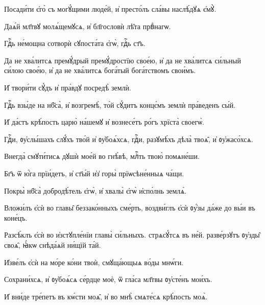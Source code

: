 \hKv Посади́ти є҆го̀ съ могꙋ́щими люде́й, и҆ престо́лъ сла́вы  наслѣ́дꙋѧ є҆мꙋ̀.  
%

\hKv Даѧ́й мл҃твꙋ молѧ́щемꙋсѧ, и҆ бл҃гословѝ лѣ̑та  првⷣнагѡ. 

\hKv Гдⷭ҇ь не́мощна сотворѝ сꙋпоста́та є҆гѡ̀, гдⷭ҇ь ст҃ъ. 
%

\hKv Да не хва́литсѧ премꙋ́дрый премꙋ́дростїю свое́ю, и҆  да не хва́литсѧ си́льный си́лою свое́ю, и҆ да не хва́литсѧ  бога́тый бога́тствомъ свои́мъ. 

\hKv И҆ твори́ти сꙋ́дъ и҆ пра́вдꙋ посредѣ̀ землѝ. 
%

\hKv Гдⷭ҇ь взы́де на нб҃са̀, и҆ возгремѣ̀, то́й сꙋ́дитъ  концє́мъ землѝ пра́веденъ сы́й. 

\hKv И҆ да́стъ крѣ́пость царю̀ на́шемꙋ и҆ вознесе́тъ ро́гъ  хрїста̀ своегѡ̀. 
%

%

\hKv Гдⷭ҇и, ᲂу҆слы́шахъ слꙋ́хъ тво́й и҆ ᲂу҆боѧ́хсѧ, гдⷭ҇и,  разꙋмѣ́хъ дѣла̀ твоѧ̑, и҆ ᲂу҆жасо́хсѧ. 

\hKv Внегда̀ смꙋти́тисѧ дꙋшѝ мое́й во гнѣ́вѣ, млⷭ҇ть твою̀  помѧне́ши. 

\hKv Бг҃ъ ѿ ю҆́га прїи́детъ, и҆ ст҃ы́й и҆з̾ горы̀  прїѡсѣне́нныѧ ча́щи. 

\hKv Покры̀ нб҃са̀ добродѣ́тель є҆гѡ̀, и҆ хвалы̀ є҆гѡ̀  и҆спо́лнь землѧ̀. 
%

\hKv Вложи́лъ є҆сѝ во главы̑ беззако́нныхъ сме́рть,  воздви́глъ є҆сѝ ᲂу҆́зы да́же до вы́и въ коне́цъ. 

\hKv Разсѣ́клъ є҆сѝ во и҆зстꙋпле́нїи главы̀ си́льныхъ.  стрѧсꙋ́тсѧ въ не́й. разве́рзꙋтъ ᲂу҆зды̑ своѧ̑, ꙗ҆́кѡ  снѣда́ѧй ни́щїй та́й. 

\hKv И҆зве́лъ є҆сѝ на мо́ре ко́ни твоѝ, смꙋща́ющыѧ во́ды  мнѡ́ги.  

\hKv Сохрани́хсѧ, и҆ ᲂу҆боѧ́сѧ се́рдце моѐ, ѿ гла́са мл҃твы  ᲂу҆сте́нъ мои́хъ. 

\hKv И҆ вни́де тре́петъ въ кѡ́сти моѧ̑, и҆ во мнѣ̀ смѧте́сѧ  крѣ́пость моѧ̀. 

